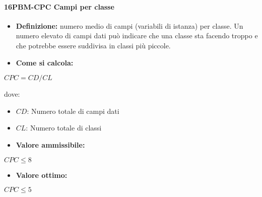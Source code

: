 \paragraph*{16PBM-CPC Campi per classe}
\begin{itemize}
    \item \textbf{Definizione:} numero medio di campi (variabili di istanza) per classe. Un numero elevato di campi dati può indicare che una classe sta facendo troppo e che potrebbe essere suddivisa in classi più piccole.
    \item \textbf{Come si calcola:}
\end{itemize}
\begin{center}
   $CPC = CD/CL$ 
\end{center}
dove:
\begin{itemize}[label=$\rightarrow$]
    \item $CD$: Numero totale di campi dati
    \item $CL$: Numero totale di classi
\end{itemize}
\begin{itemize}
    \item \textbf{Valore ammissibile:}
\end{itemize}
\begin{center}
    $CPC \leq 8$
\end{center}
\begin{itemize}
    \item \textbf{Valore ottimo:}
\end{itemize}
\begin{center}
    $CPC \leq 5$
\end{center}

